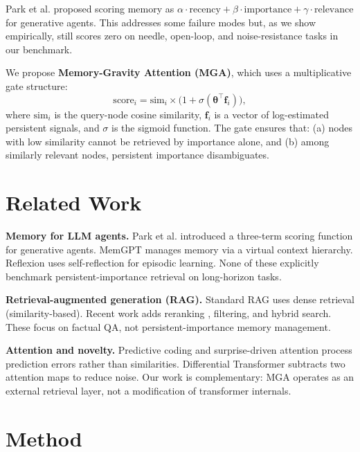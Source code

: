 \documentclass[11pt,a4paper]{article}
\begin{document}
Park et al. \citep{park2023generative} proposed scoring memory as $\alpha \cdot \text{recency} + \beta \cdot \text{importance} + \gamma \cdot \text{relevance}$ for generative agents. This addresses some failure modes but, as we show empirically, still scores zero on needle, open-loop, and noise-resistance tasks in our benchmark.

We propose \textbf{Memory-Gravity Attention (MGA)}, which uses a multiplicative gate structure:
\begin{equation}
\text{score}_i = \text{sim}_i \times \bigl(1 + \sigma(\boldsymbol{\theta}^\top \mathbf{f}_i)\bigr),
\end{equation}
where $\text{sim}_i$ is the query-node cosine similarity, $\mathbf{f}_i$ is a vector of log-estimated persistent signals, and $\sigma$ is the sigmoid function. The gate ensures that: (a) nodes with low similarity cannot be retrieved by importance alone, and (b) among similarly relevant nodes, persistent importance disambiguates.

\section{Related Work}

\textbf{Memory for LLM agents.} Park et al. \citep{park2023generative} introduced a three-term scoring function for generative agents. MemGPT \citep{packer2023memgpt} manages memory via a virtual context hierarchy. Reflexion \citep{shinn2023reflexion} uses self-reflection for episodic learning. None of these explicitly benchmark persistent-importance retrieval on long-horizon tasks.

\textbf{Retrieval-augmented generation (RAG).} Standard RAG \citep{lewis2020retrieval} uses dense retrieval (similarity-based). Recent work adds reranking \citep{glass2022re2g}, filtering, and hybrid search. These focus on factual QA, not persistent-importance memory management.

\textbf{Attention and novelty.} Predictive coding \citep{friston2010free} and surprise-driven attention \citep{itti2009bayesian} process prediction errors rather than similarities. Differential Transformer \citep{ye2024diff} subtracts two attention maps to reduce noise. Our work is complementary: MGA operates as an external retrieval layer, not a modification of transformer internals.

\section{Method}
\end{document}

